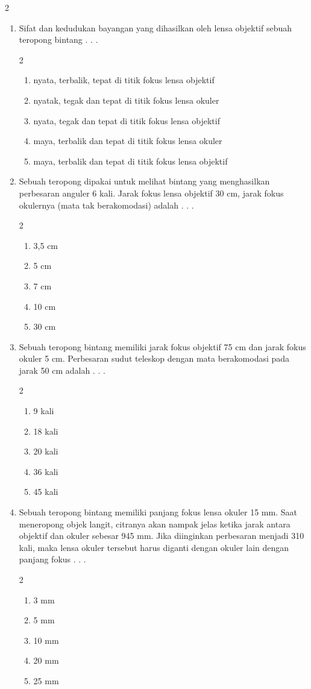 \documentclass[10pt,a4paper]{extarticle}
\newcommand{\pilgani}[1]{                            \vspace{-0.3cm}\begin{multicols}{2}
 \begin{enumerate}[label=\Alph*., itemsep=0pt,topsep=0pt,leftmargin=*,align=Center]#1                     \end{enumerate}
 \phantom{ini cuma sapi, wedus, dan ayam}
 \end{multicols}}
\begin{document}
\begin{multicols*}{2}
\begin{enumerate}
\item Sifat dan kedudukan bayangan yang dihasilkan oleh lensa objektif sebuah teropong bintang . . .
\pilgani{
	\item nyata, terbalik, tepat di titik fokus lensa objektif
	\item nyatak, tegak dan tepat di titik fokus lensa okuler
	\item nyata, tegak dan tepat di titik fokus lensa objektif
	\item maya, terbalik dan tepat di titik fokus lensa okuler
	\item maya, terbalik dan tepat di titik fokus lensa objektif
}
\vspace{2cm}

\item Sebuah teropong dipakai untuk melihat bintang yang menghasilkan perbesaran anguler 6 kali. Jarak fokus lensa objektif 30 cm, jarak fokus okulernya (mata tak berakomodasi) adalah . . .
\pilgani{
	\item 3,5 cm
	\item 5 cm
	\item 7 cm
	\item 10 cm
	\item 30 cm }
\vspace{3cm}

\item Sebuah teropong bintang memiliki jarak fokus objektif 75 cm dan jarak fokus okuler 5 cm. Perbesaran sudut teleskop dengan mata berakomodasi pada jarak 50 cm adalah . . .
\pilgani{
	\item 9 kali
	\item 18 kali
	\item 20 kali
	\item 36 kali
	\item 45 kali }

\item Sebuah teropong bintang memiliki panjang fokus lensa okuler 15 mm. Saat meneropong objek langit, citranya akan nampak jelas ketika jarak antara objektif dan okuler sebesar 945 mm. Jika diinginkan perbesaran menjadi 310 kali, maka lensa okuler tersebut harus diganti dengan okuler lain dengan panjang fokus . . . 
\pilgani{
	\item 3 mm
	\item 5 mm
	\item 10 mm
	\item 20 mm
	\item 25 mm
}
\vspace{3cm}



\end{enumerate}
\end{multicols*}
\end{document}
